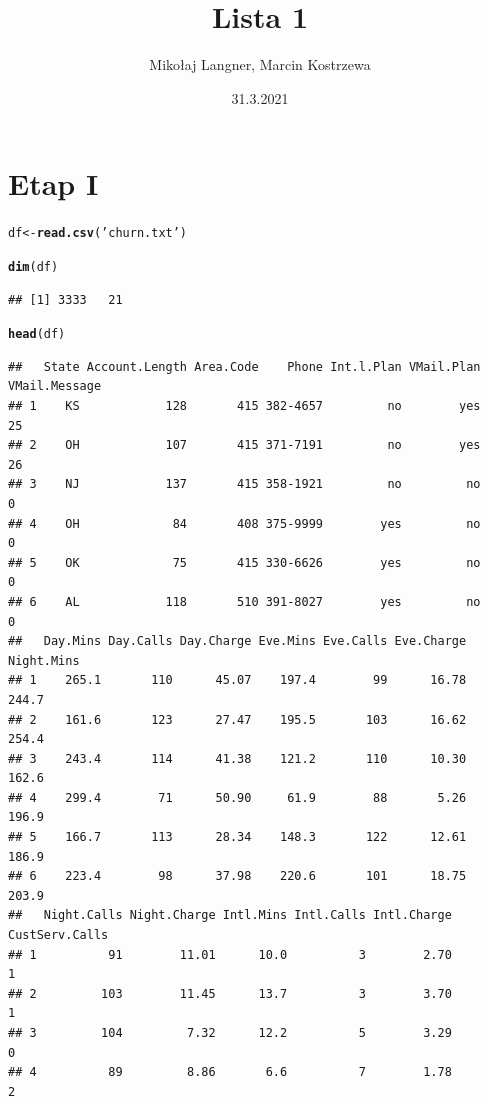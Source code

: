 \documentclass{article}\usepackage[]{graphicx}\usepackage[]{color}
\title{Lista 1}
\author{Mikołaj Langner, Marcin Kostrzewa}
\date{31.3.2021}
\makeatletter
\newcommand{\hlstr}[1]{\textcolor[rgb]{0.192,0.494,0.8}{#1}}%
\newcommand{\hlstd}[1]{\textcolor[rgb]{0.345,0.345,0.345}{#1}}%
\newcommand{\hlkwb}[1]{\textcolor[rgb]{0.69,0.353,0.396}{#1}}%
\newcommand{\hlkwd}[1]{\textcolor[rgb]{0.737,0.353,0.396}{\textbf{#1}}}%
\newenvironment{kframe}{%
 \def\at@end@of@kframe{}%
 \ifinner\ifhmode%
  \def\at@end@of@kframe{\end{minipage}}%
  \begin{minipage}{\columnwidth}%
 \fi\fi%
 \def\FrameCommand##1{\hskip\@totalleftmargin \hskip-\fboxsep
 \colorbox{shadecolor}{##1}\hskip-\fboxsep
     \hskip-\linewidth \hskip-\@totalleftmargin \hskip\columnwidth}%
 \MakeFramed {\advance\hsize-\width
   \@totalleftmargin\z@ \linewidth\hsize
   \@setminipage}}%
 {\par\unskip\endMakeFramed%
 \at@end@of@kframe}
\newenvironment{knitrout}{}{} %
\makeatother
\begin{document}
\maketitle

\section{Etap I}

\begin{knitrout}
\color{fgcolor}\begin{kframe}
\begin{alltt}
\hlstd{df} \hlkwb{<-} \hlkwd{read.csv}\hlstd{(}\hlstr{'churn.txt'}\hlstd{)}

\hlkwd{dim}\hlstd{(df)}
\end{alltt}
\begin{verbatim}
## [1] 3333   21
\end{verbatim}
\begin{alltt}
\hlkwd{head}\hlstd{(df)}
\end{alltt}
\begin{verbatim}
##   State Account.Length Area.Code    Phone Int.l.Plan VMail.Plan VMail.Message
## 1    KS            128       415 382-4657         no        yes            25
## 2    OH            107       415 371-7191         no        yes            26
## 3    NJ            137       415 358-1921         no         no             0
## 4    OH             84       408 375-9999        yes         no             0
## 5    OK             75       415 330-6626        yes         no             0
## 6    AL            118       510 391-8027        yes         no             0
##   Day.Mins Day.Calls Day.Charge Eve.Mins Eve.Calls Eve.Charge Night.Mins
## 1    265.1       110      45.07    197.4        99      16.78      244.7
## 2    161.6       123      27.47    195.5       103      16.62      254.4
## 3    243.4       114      41.38    121.2       110      10.30      162.6
## 4    299.4        71      50.90     61.9        88       5.26      196.9
## 5    166.7       113      28.34    148.3       122      12.61      186.9
## 6    223.4        98      37.98    220.6       101      18.75      203.9
##   Night.Calls Night.Charge Intl.Mins Intl.Calls Intl.Charge CustServ.Calls
## 1          91        11.01      10.0          3        2.70              1
## 2         103        11.45      13.7          3        3.70              1
## 3         104         7.32      12.2          5        3.29              0
## 4          89         8.86       6.6          7        1.78              2

\end{verbatim}
\end{kframe}
\end{knitrout}
\end{document}
